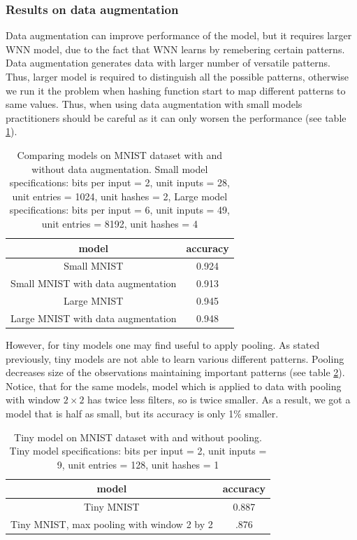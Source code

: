 \documentclass{article}[12pt]
\begin{document}
\subsubsection{Results on data augmentation}
Data augmentation can improve performance of the model, but it requires larger WNN model, due to the fact that WNN learns by remebering certain patterns. Data augmentation generates data with larger number of versatile patterns. Thus, larger model is required to distinguish all the possible patterns, otherwise we run it the problem when hashing function start to map different patterns to same values. Thus, when using data augmentation with small models practitioners should be careful as it can only worsen the performance (see table \ref{table 1}).
\begin{table}[h]
    \centering
    \begin{tabular}{|c|c|}
    \hline
    model & accuracy \\
    \hline
       Small MNIST &  0.924\\
    \hline
       Small MNIST with data augmentation  & 0.913\\
    \hline
       Large MNIST &  0.945\\
    \hline
       Large MNIST with data augmentation  & 0.948\\
    \hline
    \end{tabular}
    \caption{Comparing models on MNIST dataset with and without data augmentation. Small model specifications: bits per input = 2, unit inputs = 28, unit entries = 1024, unit hashes = 2, Large model specifications: bits per input = 6, unit inputs = 49, unit entries = 8192, unit hashes = 4}
    \label{table 1}
\end{table}

However, for tiny models one may find useful to apply pooling. As stated previously, tiny models are not able to learn various different patterns. Pooling decreases size of the observations maintaining important patterns (see table \ref{table 2}). Notice, that for the same models, model which is applied to data with pooling with window $2\times{}2$ has twice less filters, so is twice smaller. As a result, we got a model that is half as small, but its accuracy is only 1\% smaller.
\begin{table}[h]
    \centering
    \begin{tabular}{|c|c|}
    \hline
    model & accuracy \\
    \hline
       Tiny MNIST &  0.887\\
    \hline
       Tiny MNIST, max pooling with window 2 by 2  & .876\\
    \hline
    \end{tabular}
    \caption{Tiny model on MNIST dataset with and without pooling. Tiny model specifications: bits per input = 2, unit inputs = 9, unit entries = 128, unit hashes = 1}
    \label{table 2}
\end{table}
\end{document}
